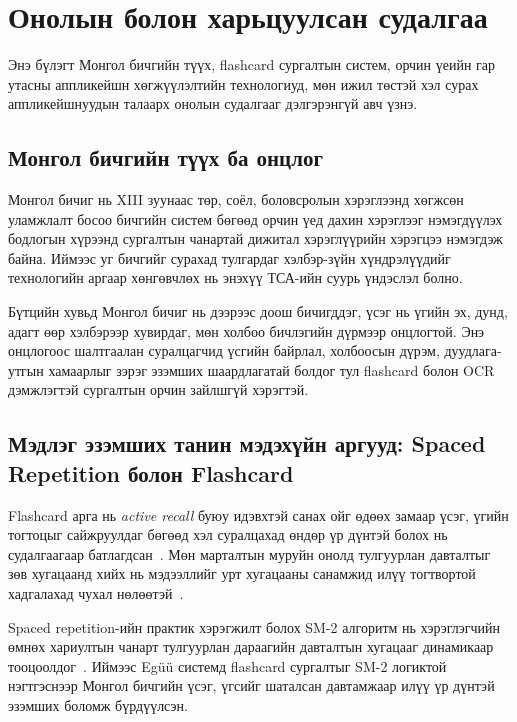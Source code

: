 
\section{Онолын болон харьцуулсан судалгаа}
\label{sec:literature-review}

Энэ бүлэгт Монгол бичгийн түүх, flashcard сургалтын систем, орчин үеийн гар утасны аппликейшн хөгжүүлэлтийн технологиуд, мөн ижил төстэй хэл сурах аппликейшнуудын талаарх онолын судалгааг дэлгэрэнгүй авч үзнэ.

\subsection{Монгол бичгийн түүх ба онцлог}
\label{subsec:mongolian-script}

Монгол бичиг нь XIII зуунаас төр, соёл, боловсролын хэрэглээнд хөгжсөн уламжлалт босоо бичгийн систем бөгөөд орчин үед дахин хэрэглээг нэмэгдүүлэх бодлогын хүрээнд сургалтын чанартай дижитал хэрэглүүрийн хэрэгцээ нэмэгдэж байна. Иймээс уг бичгийг сурахад тулгардаг хэлбэр-зүйн хүндрэлүүдийг технологийн аргаар хөнгөвчлөх нь энэхүү ТСА-ийн суурь үндэслэл болно.

Бүтцийн хувьд Монгол бичиг нь дээрээс доош бичигддэг, үсэг нь үгийн эх, дунд, адагт өөр хэлбэрээр хувирдаг, мөн холбоо бичлэгийн дүрмээр онцлогтой. Энэ онцлогоос шалтгаалан суралцагчид үсгийн байрлал, холбоосын дүрэм, дуудлага-утгын хамаарлыг зэрэг эзэмших шаардлагатай болдог тул flashcard болон OCR дэмжлэгтэй сургалтын орчин зайлшгүй хэрэгтэй.

\subsection{Мэдлэг эзэмших танин мэдэхүйн аргууд: Spaced Repetition болон Flashcard}
\label{subsec:flashcard-systems}
Flashcard арга нь \textit{active recall} буюу идэвхтэй санах ойг өдөөх замаар үсэг, үгийн тогтоцыг сайжруулдаг бөгөөд хэл суралцахад өндөр үр дүнтэй болох нь судалгаагаар батлагдсан~\cite{karpicke2008critical}. Мөн марталтын муруйн онолд тулгуурлан давталтыг зөв хугацаанд хийх нь мэдээллийг урт хугацааны санамжид илүү тогтвортой хадгалахад чухал нөлөөтэй~\cite{ebbinghaus1985memory}.

Spaced repetition-ийн практик хэрэгжилт болох SM-2 алгоритм нь хэрэглэгчийн өмнөх хариултын чанарт тулгуурлан дараагийн давталтын хугацааг динамикаар тооцоолдог~\cite{wozniak1990optimization}. Иймээс Egüü системд flashcard сургалтыг SM-2 логиктой нэгтгэснээр Монгол бичгийн үсэг, үгсийг шаталсан давтамжаар илүү үр дүнтэй эзэмших боломж бүрдүүлсэн.

